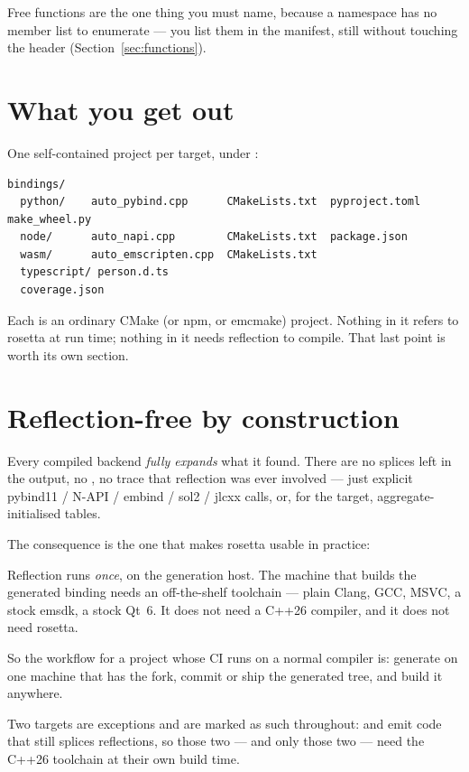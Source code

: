 Free functions are the one thing you must name, because a namespace has no
member list to enumerate --- you list them in the manifest, still without
touching the header (Section~\ref{sec:functions}).

\section{What you get out}

One self-contained project per target, under :

\begin{lstlisting}[style=plain]
bindings/
  python/    auto_pybind.cpp      CMakeLists.txt  pyproject.toml  make_wheel.py
  node/      auto_napi.cpp        CMakeLists.txt  package.json
  wasm/      auto_emscripten.cpp  CMakeLists.txt
  typescript/ person.d.ts
  coverage.json
\end{lstlisting}

Each is an ordinary CMake (or npm, or emcmake) project. Nothing in it refers to
rosetta at run time; nothing in it needs reflection to compile. That last point
is worth its own section.

\section{Reflection-free by construction}
\label{sec:reflection-free}

Every compiled backend \emph{fully expands} what it found. There are no splices
left in the output, no , no trace that reflection was
ever involved --- just explicit pybind11 / N-API / embind / sol2 / jlcxx calls,
or, for the  target, aggregate-initialised tables.

The consequence is the one that makes rosetta usable in practice:

\begin{note}
Reflection runs \emph{once}, on the generation host. The machine that builds
the generated binding needs an off-the-shelf toolchain --- plain Clang, GCC,
MSVC, a stock emsdk, a stock Qt~6. It does not need a C++26 compiler, and it
does not need rosetta.
\end{note}

So the workflow for a project whose CI runs on a normal compiler is: generate
on one machine that has the fork, commit or ship the generated tree, and build
it anywhere.

Two targets are exceptions and are marked as such throughout:  and
 emit code that still splices reflections, so those two --- and only
those two --- need the C++26 toolchain at their own build time.

